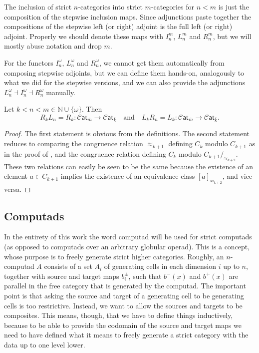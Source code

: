 \documentclass[12pt,a4paper]{article}
\numberwithin{equation}{section}
\newcommand{\cat}[1]{\mathscr{C} \mathsf{at}_{\overline{#1}}}
\begin{document}
\begin{remark}
    The inclusion of strict $n$-categories into strict $m$-categories for $n < m$ is just the composition of the stepwise inclusion maps. Since adjunctions paste together the compositions of the stepwise left (or right) adjoint is the full left (or right) adjoint. Properly we should denote these maps with $I^m_n$, $L^m_n$ and $R^m_n$, but we will mostly abuse notation and drop $m$.
\end{remark}

\begin{remark}
    For the functors $I^\omega_n$, $L^\omega_n$ and $R^\omega_n$, we cannot get them automatically from composing stepwise adjoints, but we can define them hands-on, analogously to what we did for the stepwise versions, and we can also provide the adjunctions $L^{\omega}_n \dashv I^{\omega}_n \dashv R^{\omega}_n$ manually.
\end{remark}

\begin{lemma}\label{lem:loc_and_rest_interaction}
    Let $k < n < m \in \mathbb{N} \cup \{\omega\}$. Then
    \begin{equation}
        R_k L_n = R_k : \cat{m} \xrightarrow{\quad} \cat{k} \quad \mathrm{and} \quad L_k R_n = L_k: \cat{m} \xrightarrow{\quad} \cat{k}.
    \end{equation}
\end{lemma}

\begin{proof}
    The first statement is obvious from the definitions. The second statement reduces to comparing the congruence relation $\approx_{k+1}$ defining $C_k$ modulo $C_{k+1}$ as in the proof of , and the congruence relation defining $C_k$ modulo $C_{k+1}/_{\approx_{k+2}}$. These two relations can easily be seen to be the same because the existence of an element $a \in C_{k+1}$ implies the existence of an equivalence class $[a]_{\approx_{k+2}}$, and vice versa.
\end{proof}




\subsection{Computads}\label{ssec:computads}

In the entirety of this work the word computad will be used for strict computads (as opposed to computads over an arbitrary globular operad). This is a concept, whose purpose is to freely generate strict higher categories. Roughly, an $n$-computad $A$ consists of a set $A_i$ of generating cells in each dimension $i$ up to $n$, together with source and target maps $b^{\pm}_i$, such that $b^-(x)$ and $b^+(x)$ are parallel in the free category that is generated by the computad. The important point is that asking the source and target of a generating cell to be generating cells is too restrictive. Instead, we want to allow the sources and targets to be composites. This means, though, that we have to define things inductively, because to be able to provide the codomain of the source and target maps we need to have defined what it means to freely generate a strict category with the data up to one level lower.
\end{document}
